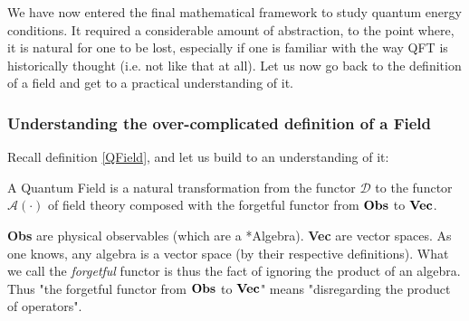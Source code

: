 \documentclass[a4paper,11pt]{article}
\numberwithin{equation}{section}
\theoremstyle{definition}
\newtheorem{comment}{Comment}
\begin{document}

We have now entered the final mathematical framework to study quantum energy conditions. It required a considerable amount of abstraction, to the point where, it is natural for one to be lost, especially if one is familiar with the way QFT is historically thought (i.e. not like that at all). Let us now go back to the definition of a field and get to a practical understanding of it.
\subsubsection{Understanding the over-complicated definition of a Field}
Recall definition \ref{QField}, and let us build to an understanding of it:
\begin{center}
    A Quantum Field is a natural transformation from the functor $\mathcal{D}$ to the functor $\mathcal{A}(\cdot)$ of field theory composed with the forgetful functor from $\bold{Obs}$ to $\bold{Vec}$.
\end{center}
\textbf{Obs} are physical observables (which are a *Algebra). \textbf{Vec} are vector spaces. As one knows, any algebra is a vector space (by their respective definitions). What we call the \emph{forgetful} functor is thus the fact of ignoring the product of an algebra. Thus "the forgetful functor from $\bold{Obs}$ to $\bold{Vec}$" means "disregarding the product of operators".\\
\end{document}
